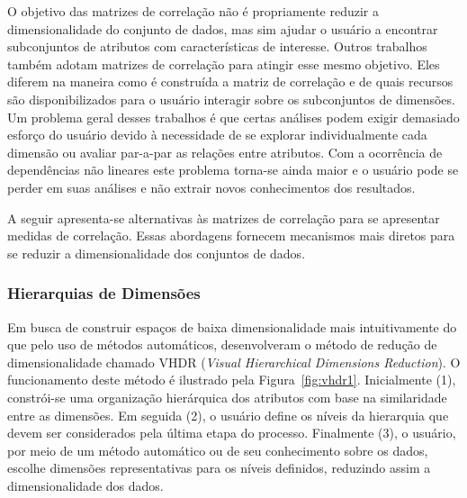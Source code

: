 O objetivo das matrizes de correlação não é propriamente
reduzir a dimensionalidade do conjunto de dados, mas sim
ajudar o usuário a encontrar subconjuntos de atributos com
características de interesse. Outros trabalhos
\cite{Friendly2002,MacEachren2003,RBF2004,May2011ss,Johansson2009,Ingram2010,May2011}
também adotam matrizes de correlação para atingir esse mesmo
objetivo. Eles diferem na maneira como é construída a
matriz de correlação e de quais recursos são
disponibilizados para o usuário interagir sobre os
subconjuntos de dimensões. Um problema geral desses
trabalhos é que certas análises podem exigir demasiado
esforço do usuário devido à necessidade de se explorar
individualmente cada dimensão ou avaliar par-a-par as
relações entre atributos. Com a ocorrência de dependências
não lineares este problema torna-se ainda maior e o usuário
pode se perder em suas análises e não extrair novos
conhecimentos dos resultados. 

A seguir apresenta-se alternativas às matrizes de correlação
para se apresentar medidas de correlação. Essas abordagens
fornecem mecanismos mais diretos para se reduzir a
dimensionalidade dos conjuntos de dados. 

\subsubsection{Hierarquias de Dimensões}

Em busca de construir espaços de baixa dimensionalidade mais
intuitivamente do que pelo uso de métodos automáticos,
\citet{Yang2003} desenvolveram o método de redução de
dimensionalidade chamado VHDR (\emph{Visual Hierarchical
Dimensions Reduction}). O funcionamento deste método é
ilustrado pela Figura~\ref{fig:vhdr1}. Inicialmente (1),
constrói-se uma organização hierárquica dos atributos com
base na similaridade entre as dimensões. Em seguida (2), o
usuário define os níveis da hierarquia que devem ser
considerados pela última etapa do processo. Finalmente (3), o
usuário, por meio de um método automático ou de seu
conhecimento sobre os dados, escolhe dimensões
representativas para os níveis definidos, reduzindo assim a
dimensionalidade dos dados. 

